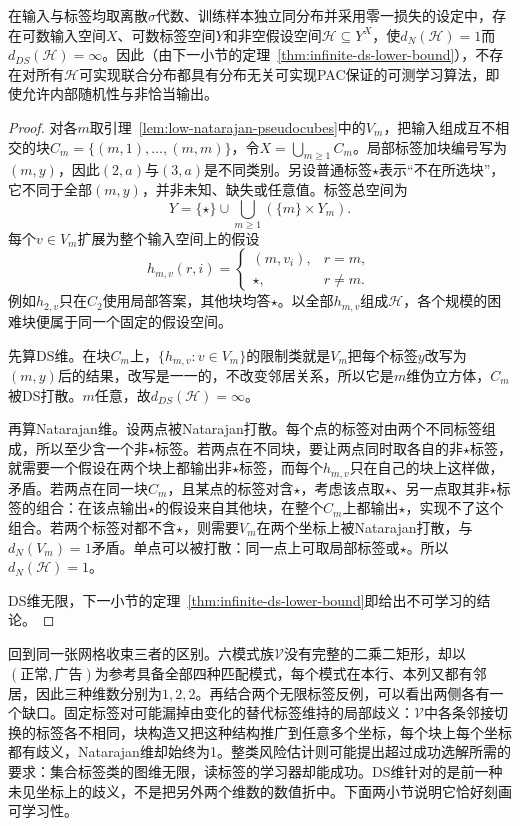 \begin{theorem}[无限标签下有限Natarajan维并不充分]
\label{thm:natarajan-infinite-counterexample}
在输入与标签均取离散$\sigma$代数、训练样本独立同分布并采用零一损失的设定中，存在可数输入空间$X$、可数标签空间$Y$和非空假设空间$\mathcal H\subseteq Y^X$，使$d_N(\mathcal H)=1$而$d_{DS}(\mathcal H)=\infty$。因此（由下一小节的定理~\ref{thm:infinite-ds-lower-bound}），不存在对所有$\mathcal H$可实现联合分布都具有分布无关可实现PAC保证的可测学习算法，即使允许内部随机性与非恰当输出。
\end{theorem}

\begin{proof}
对各$m$取引理~\ref{lem:low-natarajan-pseudocubes}中的$V_m$，把输入组成互不相交的块$C_m=\{(m,1),\ldots,(m,m)\}$，令$X=\bigcup_{m\geq1}C_m$。局部标签加块编号写为$(m,y)$，因此$(2,a)$与$(3,a)$是不同类别。另设普通标签$\star$表示“不在所选块”，它不同于全部$(m,y)$，并非未知、缺失或任意值。标签总空间为
\[
 Y=\{\star\}\cup\bigcup_{m\geq1}(\{m\}\times Y_m).
\]
每个$v\in V_m$扩展为整个输入空间上的假设
\[
 h_{m,v}(r,i)=
 \begin{cases}
 (m,v_i),&r=m,\\
 \star,&r\neq m.
 \end{cases}
\]
例如$h_{2,v}$只在$C_2$使用局部答案，其他块均答$\star$。以全部$h_{m,v}$组成$\mathcal H$，各个规模的困难块便属于同一个固定的假设空间。

先算DS维。在块$C_m$上，$\{h_{m,v}:v\in V_m\}$的限制类就是$V_m$把每个标签$y$改写为$(m,y)$后的结果，改写是一一的，不改变邻居关系，所以它是$m$维伪立方体，$C_m$被DS打散。$m$任意，故$d_{DS}(\mathcal H)=\infty$。

再算Natarajan维。设两点被Natarajan打散。每个点的标签对由两个不同标签组成，所以至少含一个非$\star$标签。若两点在不同块，要让两点同时取各自的非$\star$标签，就需要一个假设在两个块上都输出非$\star$标签，而每个$h_{m,v}$只在自己的块上这样做，矛盾。若两点在同一块$C_m$，且某点的标签对含$\star$，考虑该点取$\star$、另一点取其非$\star$标签的组合：在该点输出$\star$的假设来自其他块，在整个$C_m$上都输出$\star$，实现不了这个组合。若两个标签对都不含$\star$，则需要$V_m$在两个坐标上被Natarajan打散，与$d_N(V_m)=1$矛盾。单点可以被打散：同一点上可取局部标签或$\star$。所以$d_N(\mathcal H)=1$。

DS维无限，下一小节的定理~\ref{thm:infinite-ds-lower-bound}即给出不可学习的结论。
\end{proof}

回到同一张网格收束三者的区别。六模式族$\mathcal V$没有完整的二乘二矩形，却以$(\text{正常},\text{广告})$为参考具备全部四种匹配模式，每个模式在本行、本列又都有邻居，因此三种维数分别为$1,2,2$。再结合两个无限标签反例，可以看出两侧各有一个缺口。固定标签对可能漏掉由变化的替代标签维持的局部歧义：$\mathcal V$中各条邻接切换的标签各不相同，块构造又把这种结构推广到任意多个坐标，每个块上每个坐标都有歧义，Natarajan维却始终为1。整类风险估计则可能提出超过成功选解所需的要求：集合标签类的图维无限，读标签的学习器却能成功。DS维针对的是前一种未见坐标上的歧义，不是把另外两个维数的数值折中。下面两小节说明它恰好刻画可学习性。

